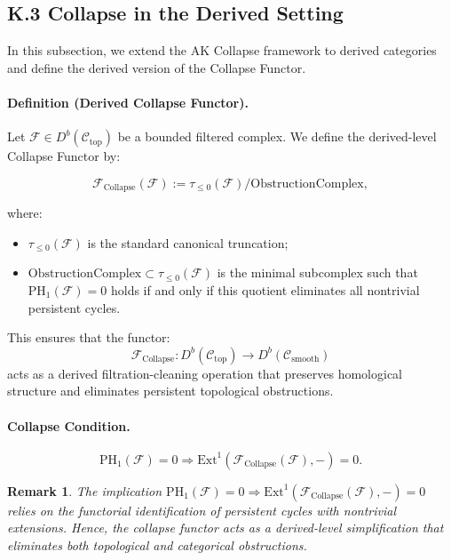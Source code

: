\documentclass[11pt]{article}
\newtheorem{remark}[theorem]{Remark}
\begin{document}
\subsection*{K.3 Collapse in the Derived Setting}

In this subsection, we extend the AK Collapse framework to derived categories and define the derived version of the Collapse Functor.

\paragraph{Definition (Derived Collapse Functor).}
Let \( \mathcal{F} \in D^b(\mathcal{C}_{\mathrm{top}}) \) be a bounded filtered complex.  
We define the derived-level Collapse Functor by:

\[
\mathcal{F}_{\mathrm{Collapse}}(\mathcal{F}) := \tau_{\leq 0}(\mathcal{F}) / \mathrm{ObstructionComplex},
\]

where:
\begin{itemize}
    \item \( \tau_{\leq 0}(\mathcal{F}) \) is the standard canonical truncation;
    \item \( \mathrm{ObstructionComplex} \subset \tau_{\leq 0}(\mathcal{F}) \) is the minimal subcomplex such that \( \mathrm{PH}_1(\mathcal{F}) = 0 \) holds if and only if this quotient eliminates all nontrivial persistent cycles.
\end{itemize}

This ensures that the functor:
\[
\mathcal{F}_{\mathrm{Collapse}} : D^b(\mathcal{C}_{\mathrm{top}}) \to D^b(\mathcal{C}_{\mathrm{smooth}})
\]
acts as a derived filtration-cleaning operation that preserves homological structure and eliminates persistent topological obstructions.

\paragraph{Collapse Condition.}
\[
\mathrm{PH}_1(\mathcal{F}) = 0 \Rightarrow \mathrm{Ext}^1(\mathcal{F}_{\mathrm{Collapse}}(\mathcal{F}), -) = 0.
\]

\begin{remark}
The implication \( \mathrm{PH}_1(\mathcal{F}) = 0 \Rightarrow \mathrm{Ext}^1(\mathcal{F}_{\mathrm{Collapse}}(\mathcal{F}), -) = 0 \)  
relies on the functorial identification of persistent cycles with nontrivial extensions.  
Hence, the collapse functor acts as a derived-level simplification that eliminates both topological and categorical obstructions.
\end{remark}
\end{document}

